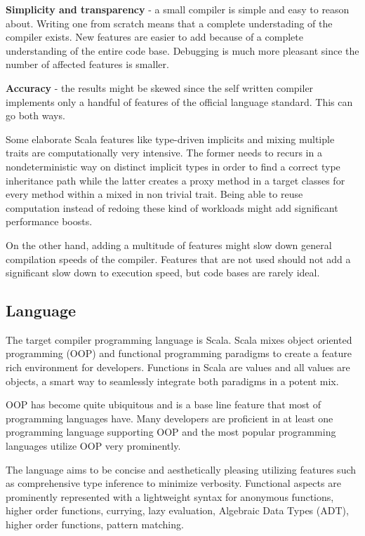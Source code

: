 \documentclass{VUMIFPSbakalaurinis}
\begin{document}
\textbf{Simplicity and transparency} - a small compiler is simple and easy to reason about.
Writing one from scratch means that a complete understading of the compiler exists.
New features are easier to add because of a complete understanding of the entire code base.
Debugging is much more pleasant since the number of affected features is smaller.

\textbf{Accuracy} - the results might be skewed since the self written compiler implements only a handful of features of the official language standard.
This can go both ways.

Some elaborate Scala features like type-driven implicits and mixing multiple traits are computationally very intensive.
The former needs to recurs in a nondeterministic way on distinct implicit types in order to find a correct type inheritance path while the latter creates a proxy method in a target classes for every method within a mixed in non trivial trait.
Being able to reuse computation instead of redoing these kind of workloads might add significant performance boosts.

On the other hand, adding a multitude of features might slow down general compilation speeds of the compiler.
Features that are not used should not add a significant slow down to execution speed, but code bases are rarely ideal.

\subsection{Language}
The target compiler programming language is Scala.
Scala mixes object oriented programming (OOP)  and functional programming paradigms to create a feature rich environment for developers.
Functions in Scala are values and all values are objects, a smart way to seamlessly integrate both paradigms in a potent mix.

OOP has become quite ubiquitous and is a base line feature that most of programming languages have.
Many developers are proficient in at least one programming language supporting OOP and the most popular programming languages utilize OOP very prominently.

The language aims to be concise and aesthetically pleasing utilizing features such as comprehensive type inference to minimize verbosity.
Functional aspects are prominently represented with a lightweight syntax for anonymous functions, higher order functions, currying, lazy evaluation, Algebraic Data Types (ADT), higher order functions, pattern matching.
\end{document}
